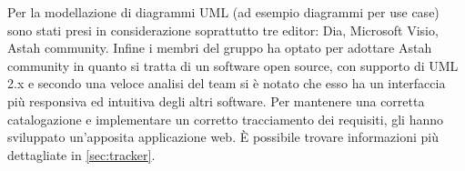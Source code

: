 			Per la modellazione di diagrammi UML (ad esempio diagrammi per use case) sono stati presi in considerazione soprattutto tre editor: Dia, Microsoft Visio, Astah community. Infine i membri del gruppo \groupname{} ha optato per adottare Astah community in quanto si tratta di un software open source, con supporto di UML 2.x e secondo una veloce analisi del team si è notato che esso ha un interfaccia più responsiva ed intuitiva degli altri software.
			Per mantenere una corretta catalogazione e implementare un corretto tracciamento dei requisiti, gli  hanno sviluppato un'apposita applicazione web. È possibile trovare informazioni più dettagliate in \autoref{sec:tracker}.

